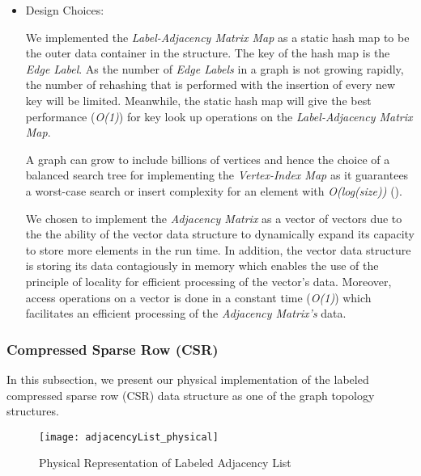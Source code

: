 {\begin{itemize}
By summing up the complexity of the three operations, the overall complexity of searching the structure is \textit{O(3 + 2log(n))}.

\item{Design Choices:}

We implemented the \textit{Label-Adjacency Matrix Map} as a static hash map to be the outer data container in the structure. The key of the hash map is the \textit{Edge Label}. As the number of \textit{Edge Labels} in a graph is not growing rapidly, the number of rehashing that is performed with the insertion of every new key will be limited. Meanwhile, the static hash map will give the best performance (\textit{O(1)}) for key look up operations on the \textit{Label-Adjacency Matrix Map}.

A graph can grow to include billions of vertices and hence the choice of a balanced search tree for implementing the \textit{Vertex-Index Map} as it guarantees a worst-case search or insert complexity for an element with \textit{O(log(size))}
(\cite{NSA}).

We chosen to implement the \textit{Adjacency Matrix} as a vector of vectors due to the the ability of the vector data structure to dynamically expand its capacity to store more elements in the run time. In addition, the vector data structure is storing its data contagiously in memory which enables the use of the principle of locality for efficient processing of the vector's data. Moreover, access operations on a vector is done in a constant time (\textit{O(1)}) which facilitates an efficient processing of the \textit{Adjacency Matrix's} data.

\end{itemize}

\subsubsection{Compressed Sparse Row (CSR)}

In this subsection, we present our physical implementation of the labeled compressed sparse row (CSR) data structure as one of the graph topology structures.



\begin{figure}[h]
\centering
\hspace*{-0.4in}
\texttt{[image: adjacencyList\_physical]}
\caption{Physical Representation of Labeled Adjacency List}
\label{fig_adjacencyList_physical}
\end{figure}


}
